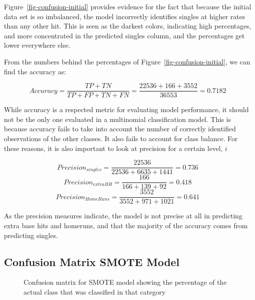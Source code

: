 \documentclass[
  letterpaper,
  DIV=11,
  numbers=noendperiod]{scrartcl}
\begin{document}
Figure~\ref{fig-confusion-initial} provides evidence for the fact that
because the initial data set is so imbalanced, the model incorrectly
identifies singles at higher rates than any other hit. This is seen as
the darkest colors, indicating high percentages, and more concentrated
in the predicted singles column, and the percentages get lower
everywhere else.

From the numbers behind the percentages of
Figure~\ref{fig-confusion-initial}, we can find the accuracy as:

\[ Accuracy = \frac{TP + TN}{TP + FP + TN + FN} = \frac{22536 + 166 + 3552}{36553} = 0.7182\]

While accuracy is a respected metric for evaluating model performance,
it should not be the only one evaluated in a multinomial classification
model. This is because accuracy fails to take into account the number of
correctly identified observations of the other classes. It also fails to
account for class balance. For these reasons, it is also important to
look at precision for a certain level, \(i\)

\[Precision_{singles} = \frac{22536}{22536 + 6635+ 1441} = 0.736\]
\[Precision_{extraBH} = \frac{166}{166 + 139 + 92} = 0.418\]
\[Precision_{HomeRuns} = \frac{3552}{3552 + 971 + 1021} = 0.641\]

As the precision measures indicate, the model is not precise at all in
predicting extra base hits and homeruns, and that the majority of the
accuracy comes from predicting singles.

\subsection{Confusion Matrix SMOTE
Model}\label{confusion-matrix-smote-model}

\begin{figure}[H]


\caption{\label{fig-confusion-smote}Confusion matrix for SMOTE model
showing the percentage of the actual class that was classified in that
category}

\end{figure}%
\end{document}
